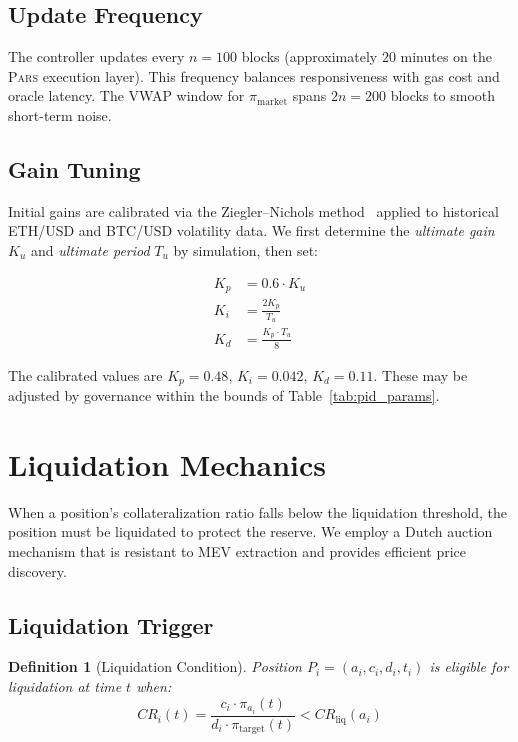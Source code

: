 \documentclass[11pt,a4paper]{article}
\newcommand{\Pars}{\textsc{Pars}\xspace}
\newcommand{\CR}{\mathit{CR}}
\newtheorem{definition}{Definition}
\begin{document}
\subsection{Update Frequency}

The controller updates every $n = 100$ blocks (approximately $20$ minutes on the \Pars execution layer).
This frequency balances responsiveness with gas cost and oracle latency.
The VWAP window for $\pi_{\text{market}}$ spans $2n = 200$ blocks to smooth short-term noise.

\subsection{Gain Tuning}

Initial gains are calibrated via the Ziegler--Nichols method~\citep{ziegler1942} applied to historical ETH/USD and BTC/USD volatility data.
We first determine the \emph{ultimate gain} $K_u$ and \emph{ultimate period} $T_u$ by simulation, then set:

\begin{align}
  K_p &= 0.6 \cdot K_u \\
  K_i &= \frac{2 K_p}{T_u} \\
  K_d &= \frac{K_p \cdot T_u}{8}
\end{align}

The calibrated values are $K_p = 0.48$, $K_i = 0.042$, $K_d = 0.11$.
These may be adjusted by governance within the bounds of Table~\ref{tab:pid_params}.

\section{Liquidation Mechanics}
\label{sec:liquidation}

When a position's collateralization ratio falls below the liquidation threshold, the position must be liquidated to protect the reserve.
We employ a Dutch auction mechanism that is resistant to MEV extraction and provides efficient price discovery.

\subsection{Liquidation Trigger}

\begin{definition}[Liquidation Condition]
Position $P_i = (a_i, c_i, d_i, t_i)$ is eligible for liquidation at time $t$ when:
\begin{equation}
  \CR_i(t) = \frac{c_i \cdot \pi_{a_i}(t)}{d_i \cdot \pi_{\text{target}}(t)} < \CR_{\text{liq}}(a_i)
\end{equation}
\end{definition}
\end{document}
